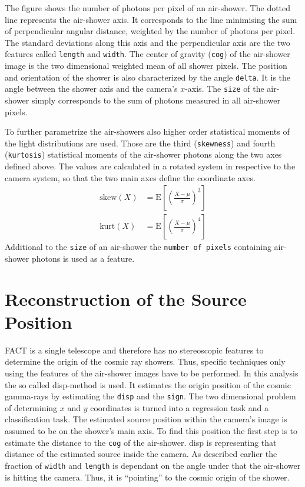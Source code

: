 %
The figure shows the number of photons per pixel of an air-shower. The dotted
line represents the air-shower axis. It corresponds to the line minimising the
sum of perpendicular angular distance, weighted by the number of photons per
pixel. The standard deviations along this axis and the perpendicular axis are
the two features called \texttt{length} and \texttt{width}. The center of
gravity (\texttt{cog}) of the air-shower image is the two dimensional weighted
mean of all shower pixels. The position and orientation of the shower is also
characterized by the angle \texttt{delta}. It is the angle between the shower
axis and the camera's $x$-axis. The \texttt{size} of the air-shower simply
corresponds to the sum of photons measured in all air-shower pixels.

To further parametrize the air-showers also higher order statistical moments of
the light distributions are used. Those are the third (\texttt{skewness}) and
fourth (\texttt{kurtosis}) statistical moments of the air-shower photons along
the two axes defined above. The values are calculated in a rotated system in
respective to the camera system, so that the two main axes define the
coordinate axes.
%
\begin{align}
  \text{skew}(X) &= \text{E}\left[\left(\frac{X-\mu}{\sigma}\right)^3\right] \label{eq:skew} \\
  \text{kurt}(X) &= \text{E}\left[\left(\frac{X-\mu}{\sigma}\right)^4\right]  \label{eq:kurt}
\end{align}
%
Additional to the \texttt{size} of an air-shower the \texttt{number of pixels}
containing air-shower photons is used as a feature.
%
\section{Reconstruction of the Source Position}
\label{sec:source_pos}%
%
FACT is a single telescope and therefore has no stereoscopic features to
determine the origin of the cosmic ray showers. Thus, specific techniques only
using the features of the air-shower images have to be performed. In this
analysis the so called disp-method is used. It estimates the origin position of
the cosmic gamma-rays by estimating the \texttt{disp} and the \texttt{sign}. The two
dimensional problem of determining $x$ and $y$ coordinates is turned into a
regression task and a classification task. The estimated source position within
the camera's image is assumed to be on the shower's main axis. To find this
position the first step is to estimate the distance to the \texttt{cog} of the
air-shower. disp is representing that distance of the estimated source inside
the camera. As described earlier the fraction of \texttt{width} and \texttt{length} is dependant
on the angle under that the air-shower is hitting the camera. Thus, it is
\enquote{pointing} to the cosmic origin of the shower.

